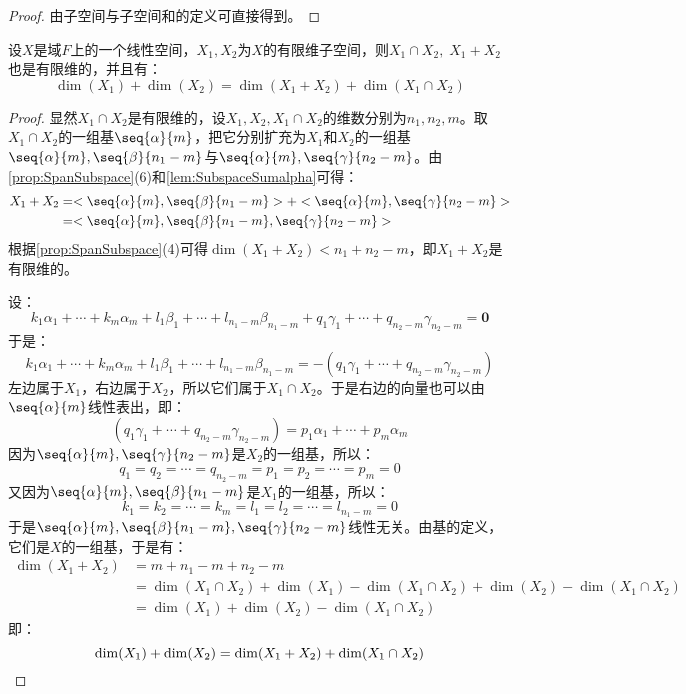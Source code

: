 \begin{proof}
	由子空间与子空间和的定义可直接得到。
\end{proof}
\begin{theorem}\label{theo:DimOfSubspace}
	设$X$是域$F$上的一个线性空间，$X_1,X_2$为$X$的有限维子空间，则$X_1\cap X_2,\;X_1+X_2$也是有限维的，并且有：
	\begin{equation*}
		\dim(X_1)+\dim(X_2)=\dim(X_1+X_2)+\dim(X_1\cap X_2)
	\end{equation*}
\end{theorem}
\begin{proof}
	显然$X_1\cap X_2$是有限维的，设$X_1,X_2,X_1\cap X_2$的维数分别为$n_1,n_2,m$。取$X_1\cap X_2$的一组基$\seq{\alpha}{m}$，把它分别扩充为$X_1$和$X_2$的一组基$\seq{\alpha}{m},\seq{\beta}{n_1-m}$与$\seq{\alpha}{m},\seq{\gamma}{n_2-m}$。由\cref{prop:SpanSubspace}(6)和\cref{lem:SubspaceSumalpha}可得：
	\begin{align*}
		X_1+X_2
		&=<\seq{\alpha}{m},\seq{\beta}{n_1-m}>+<\seq{\alpha}{m},\seq{\gamma}{n_2-m}> \\
		&=<\seq{\alpha}{m},\seq{\beta}{n_1-m},\seq{\gamma}{n_2-m}>
	\end{align*}
	根据\cref{prop:SpanSubspace}(4)可得$\operatorname{dim}(X_1+X_2)<n_1+n_2-m$，即$X_1+X_2$是有限维的。\par
	设：
	\begin{equation*}
		k_1\alpha_1+\cdots+k_m\alpha_m+l_1\beta_1+\cdots+l_{n_1-m}\beta_{n_1-m}+q_1\gamma_1+\cdots+q_{n_2-m}\gamma_{n_2-m}=\mathbf{0}
	\end{equation*}
	于是：
	\begin{equation*}
		k_1\alpha_1+\cdots+k_m\alpha_m+l_1\beta_1+\cdots+l_{n_1-m}\beta_{n_1-m}=-(q_1\gamma_1+\cdots+q_{n_2-m}\gamma_{n_2-m})
	\end{equation*}
	左边属于$X_1$，右边属于$X_2$，所以它们属于$X_1\cap X_2$。于是右边的向量也可以由$\seq{\alpha}{m}$线性表出，即：
	\begin{equation*}
		(q_1\gamma_1+\cdots+q_{n_2-m}\gamma_{n_2-m})=p_1\alpha_1+\cdots+p_m\alpha_m
	\end{equation*}
	因为$\seq{\alpha}{m},\seq{\gamma}{n_2-m}$是$X_2$的一组基，所以：
	\begin{equation*}
		q_1=q_2=\cdots=q_{n_2-m}=p_1=p_2=\cdots=p_m=0
	\end{equation*}
	又因为$\seq{\alpha}{m},\seq{\beta}{n_1-m}$是$X_1$的一组基，所以：
	\begin{equation*}
		k_1=k_2=\cdots=k_m=l_1=l_2=\cdots=l_{n_1-m}=0
	\end{equation*}
	于是$\seq{\alpha}{m},\seq{\beta}{n_1-m},\seq{\gamma}{n_2-m}$线性无关。由基的定义，它们是$X$的一组基，于是有：
	\begin{align*}
		\dim(X_1+X_2)
		&=m+n_1-m+n_2-m \\
		&=\dim(X_1\cap X_2)+\dim(X_1)-\dim(X_1\cap X_2)+\dim(X_2)-\dim(X_1\cap X_2) \\
		&=\dim(X_1)+\dim(X_2)-\dim(X_1\cap X_2)
	\end{align*}
	即：
	\begin{equation*}
		\dim(X_1)+\dim(X_2)=\dim(X_1+X_2)+\dim(X_1\cap X_2)\qedhere
	\end{equation*}
\end{proof}
